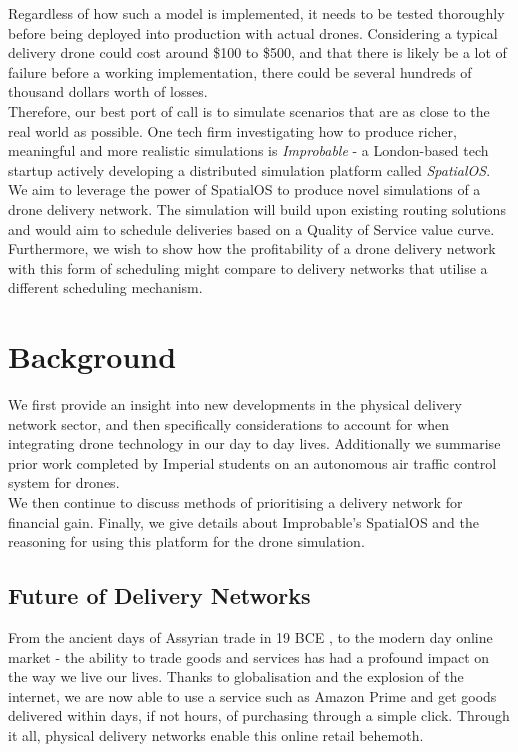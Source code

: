 \documentclass[a4paper,12pt,titlepage]{article}
\begin{document}
Regardless of how such a model is implemented, it needs to be tested thoroughly before being deployed into production with actual drones. Considering a typical delivery drone could cost around \$100 to \$500\cite{Menon2013}, and that there is likely be a lot of failure before a working implementation, there could be several hundreds of thousand dollars worth of losses. \\

Therefore, our best port of call is to simulate scenarios that are as close to the real world as possible. One tech firm investigating how to produce richer, meaningful and more realistic simulations is \textit{Improbable}\cite{ImprobableWorldsLtd.2018a} - a London-based tech startup actively developing a distributed simulation platform called \textit{SpatialOS}\cite{ImprobableWorldsLtd.2018b}. \\

We aim to leverage the power of SpatialOS to produce novel simulations of a drone delivery network. The simulation will build upon existing routing solutions\cite{Balaji2017} and would aim to schedule deliveries based on a Quality of Service value curve. Furthermore, we wish to show how the profitability of a drone delivery network with this form of scheduling might compare to delivery networks that utilise a different scheduling mechanism.

\newpage
\section{Background}
We first provide an insight into new developments in the physical delivery network sector, and then specifically considerations to account for when integrating drone technology in our day to day lives. Additionally we summarise prior work completed by Imperial students on an autonomous air traffic control system for drones. \\

We then continue to discuss methods of prioritising a delivery network for financial gain. Finally, we give details about Improbable's SpatialOS and the reasoning for using this platform for the drone simulation.

\subsection{Future of Delivery Networks}
From the ancient days of Assyrian trade in 19 BCE \cite{stearns2001the}, to the modern day online market - the ability to trade goods and services has had a profound impact on the way we live our lives. Thanks to globalisation and the explosion of the internet, we are now able to use a service such as Amazon Prime and get goods delivered within days, if not hours, of purchasing through a simple click. Through it all, physical delivery networks enable this online retail behemoth. \\
\end{document}
